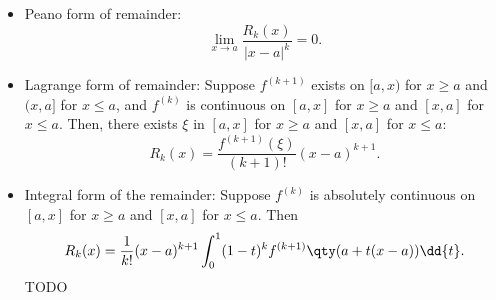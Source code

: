 \documentclass[a4paper,12pt]{report}
\begin{document}
\begin{itemize}
\begin{itemize}
\subsubsection{Uniqueness}
Let $f\colon D\subseteq\mathbb{R}^m\to\mathbb{R}$ be a function, let $a$ be any point, $I\subseteq D$ be any open ball centered $a$, if there exists a series such that:
\[f(x)=\sum_{\alpha\in\mathbb{N}_0^{\pht{0}m}}\frac{c_{\alpha}}{\alpha !}(x-a)^{\alpha},\]
for all $x\in I$, then
\[c_{\alpha}=D^{\alpha}f(a).\]
\bpr
Fix any multi-index $\beta$. Apply $D^{\beta}$ to both sides
\[D^{\beta}f(x)=\sum_{\alpha\in\bbN_0^{\pht{0}m}}\frac{c_{\alpha}}{\alpha !}D^{\beta}(x-a)^{\alpha}\]
\[D^{\beta}(x-a)^{\alpha}=\bcs
\frac{\alpha !}{(\alpha-\beta)!}(x-a)^{\alpha-\beta},\quad&\beta\leq\alpha\\
0,\quad&\tx{otherwise}\ecs.\]
\[D^{\beta}f(x)=\sum_{\alpha\in\bbN_0^{\pht{0}m}\land\beta\leq\alpha}\frac{c_{\alpha}}{(\alpha-\beta)!}(x-a)^{\alpha-\beta}\]
Evaluate $a$, only $\alpha=\beta$ term survives. Thus,
\[D^{\beta}f(a)=c_{\beta}.\]
\epr
\subsubsection{Taylor's theorem on the reals}
Let $k\in\bbN$, and function $f\colon D\subseteq\bbR\to\bbR$ be $k$ times differentiable at a point $a\in D$. Then there exists a real-valued function $R_k$ defined on an open interval containing $a$ such that
\[f(x)=\sum_{n=0}^k\frac{f^{(n)}(a)}{n!}(x-a)^n+R_k(x),\]
and that
\bit
\item Peano form of remainder:
\[\lim_{x\to a}\frac{R_k(x)}{|x-a|^k}=0.\]
\item Lagrange form of remainder: Suppose $f^{(k+1)}$ exists on $[a,x)$ for $x\geq a$ and $(x,a]$ for $x\leq a$, and $f^{(k)}$ is continuous on $[a,x]$ for $x\geq a$ and $[x,a]$ for $x\leq a$. Then, there exists $\xi$ in $[a,x]$ for $x\geq a$ and $[x,a]$ for $x\leq a$:
\[R_k(x)=\frac{f^{(k+1)}(\xi)}{(k+1)!}(x-a)^{k+1}.\]
\item Integral form of the remainder: Suppose $f^{(k)}$ is absolutely continuous on $[a,x]$ for $x\geq a$ and $[x,a]$ for $x\leq a$. Then
\[R_k(x)=\frac{1}{k!}(x-a)^{k+1}\int_0^1(1-t)^kf^{(k+1)}\qty(a+t(x-a))\dd{t}.\]
\eit
\bpr
TODO
\epr

\end{itemize}
\end{itemize}
\end{document}
